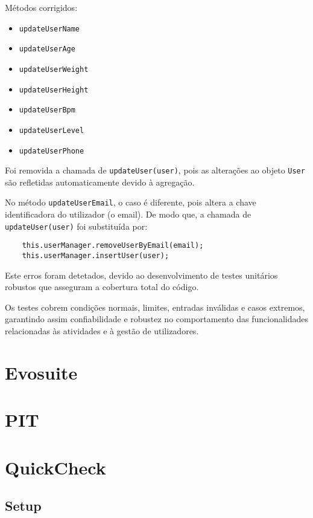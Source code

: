 \documentclass[12pt, a4paper]{article}
\begin{document}
Métodos corrigidos:
\begin{itemize}
    \item \texttt{updateUserName}
    \item \texttt{updateUserAge}
    \item \texttt{updateUserWeight}
    \item \texttt{updateUserHeight}
    \item \texttt{updateUserBpm}
    \item \texttt{updateUserLevel}
    \item \texttt{updateUserPhone}
\end{itemize}

Foi removida a chamada de \texttt{updateUser(user)}, pois as alterações ao objeto \texttt{User} são
refletidas automaticamente devido à agregação.

No método \texttt{updateUserEmail}, o caso é diferente, pois altera a chave identificadora do
utilizador (o email). De modo que, a chamada de \texttt{updateUser(user)} foi substituída por:
\begin{verbatim}
    this.userManager.removeUserByEmail(email);
    this.userManager.insertUser(user);
\end{verbatim}

Este erros foram detetados, devido ao desenvolvimento de testes unitários robustos que asseguram a
cobertura total do código.

Os testes cobrem condições normais, limites, entradas inválidas e casos extremos, garantindo assim
confiabilidade e robustez no comportamento das funcionalidades relacionadas às atividades e à gestão
de utilizadores.

\section{Evosuite}

\section{PIT}

\section{QuickCheck}

\subsection{Setup}
\end{document}

